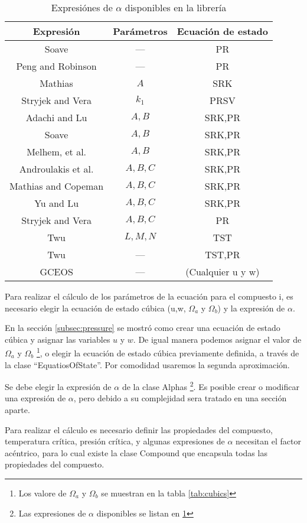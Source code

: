 \begin{table}
\begin{tabular}{|c |c|c| }
	\hline
	Expresión & Parámetros & Ecuación de estado\\
	\hline
	Soave    &  ---& PR\\
	Peng and Robinson & ---& PR \\
	Mathias & $A$ & SRK\\
	Stryjek and Vera & $k_1$ & PRSV\\
	Adachi and Lu & $A,B$&SRK,PR\\
	Soave & $A,B$&SRK,PR\\
	Melhem, et al. & $A,B$&SRK,PR\\
	Androulakis et al. & $A,B,C$& SRK,PR\\
	Mathias and Copeman & $A,B,C$& SRK,PR\\
	Yu and Lu & $A,B,C$&SRK,PR\\
	Stryjek and Vera & $A,B,C$&PR\\
	Twu & $L,M,N$&TST\\
	Twu & ---&TST,PR\\
	GCEOS & ---& (Cualquier u y w)\\
	\hline
\end{tabular}
\caption{Expresiónes de $\alpha$ disponibles en la librería}\label{tab:alphas}
\end{table}


Para realizar el cálculo de los parámetros de la ecuación para el compuesto i, es necesario elegir la ecuación de estado cúbica (u,w, $\Omega_a$ y $\Omega_b$) y la expresión de $\alpha$.

En la sección \ref{subsec:pressure} se mostró como crear una ecuación de estado cúbica y asignar las variables $u$ y $w$. De igual manera podemos asignar el valor de $\Omega_a$ y $\Omega_b$ \footnote{Los valore de $\Omega_a$ y $\Omega_b$ se muestran en la tabla \ref{tab:cubics}}, o elegir la ecuación de estado cúbica previamente definida, a través de la clase ``EquatiosOfState''. Por comodidad usaremos la segunda aproximación.

Se debe elegir la expresión de $\alpha$ de la clase Alphas \footnote{Las expresiones de $\alpha$ disponibles se listan en \ref{tab:alphas}}. Es posible crear o modificar una expresión de $\alpha$, pero debido a su complejidad sera tratado en una sección aparte.

Para realizar el cálculo es necesario definir las propiedades del compuesto, temperatura crítica, presión crítica, y algunas expresiones de $\alpha$ necesitan el factor acéntrico, para lo cual existe la clase Compound que encapsula todas las propiedades del compuesto.



